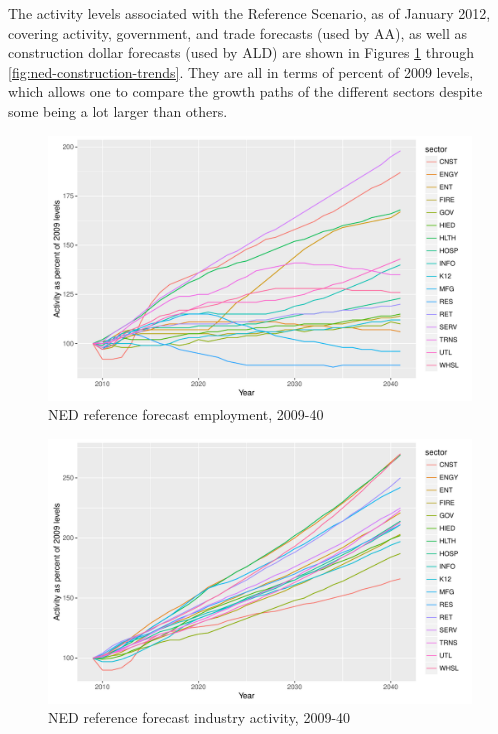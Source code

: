 

The activity levels associated with the Reference Scenario, as of January 2012, covering activity, government, and trade forecasts (used by AA), as well as construction dollar forecasts (used by ALD) are shown in Figures \ref{fig:ned-employment-trends} through \ref{fig:ned-construction-trends}. They are all in terms of percent of 2009 levels, which allows one to compare the growth paths of the different sectors despite some being a lot larger than others.

\begin{figure}
\centering
\includegraphics[width=6.5in]{ned/employment_forecast}
\caption{NED reference forecast employment, 2009-40}\label{fig:ned-employment-trends}
\end{figure}

\begin{figure}
\centering
\includegraphics[width=6.5in]{ned/activity_forecast}
\caption{NED reference forecast industry activity, 2009-40}
\end{figure}

